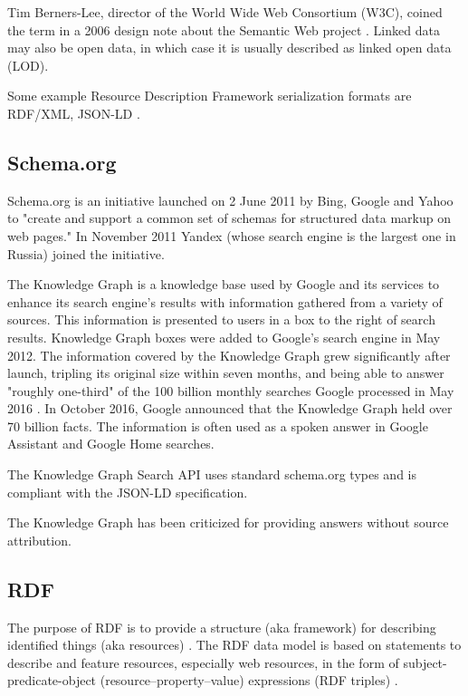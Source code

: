 Tim Berners-Lee, director of the World Wide Web Consortium (W3C), coined the term in a 2006 design note about the Semantic Web project \cite{LinkedData}. Linked data may also be open data, in which case it is usually described as linked open data (LOD).

Some example Resource Description Framework serialization formats are RDF/XML, JSON-LD \cite{JSON-LD}. 
\subsection{Schema.org}

Schema.org \cite{Schema.org} is an initiative launched on 2 June 2011 by Bing, Google and Yahoo to "create and support a common set of schemas for structured data markup on web pages." In November 2011 Yandex (whose search engine is the largest one in Russia) joined the initiative.

The Knowledge Graph is a knowledge base used by Google and its services to enhance its search engine's results with information gathered from a variety of sources. This information is presented to users in a box to the right of search results. Knowledge Graph boxes were added to Google's search engine in May 2012. The information covered by the Knowledge Graph grew significantly after launch, tripling its original size within seven months, and being able to answer "roughly one-third" of the 100 billion monthly searches Google processed in May 2016 \cite{Knowledge_Graph}.
In October 2016, Google announced that the Knowledge Graph held over 70 billion facts. The information is often used as a spoken answer in Google Assistant and Google Home searches. 

The Knowledge Graph Search API uses standard schema.org types and is compliant with the JSON-LD specification.

The Knowledge Graph has been criticized for providing answers without source attribution.

\subsection{RDF}
\label{sec:RDF}
The purpose of RDF is to provide a structure (aka framework)
for describing identified things (aka resources) \cite{RDFandOWL_SenmanticWebAffinityGroup}.
The RDF data model is based on statements to describe and feature resources, especially web resources, in the form of subject-predicate-object (resource–property–value) expressions (RDF triples) \cite{rdf-triples}.

